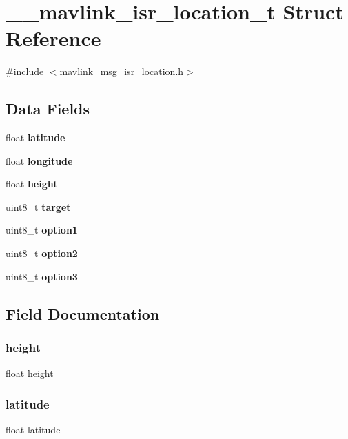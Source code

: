 \section{\+\_\+\+\_\+mavlink\+\_\+isr\+\_\+location\+\_\+t Struct Reference}
\label{struct____mavlink__isr__location__t}


{\ttfamily \#include $<$mavlink\+\_\+msg\+\_\+isr\+\_\+location.\+h$>$}

\subsection*{Data Fields}
\begin{DoxyCompactItemize}
\item 
float \textbf{ latitude}
\item 
float \textbf{ longitude}
\item 
float \textbf{ height}
\item 
uint8\+\_\+t \textbf{ target}
\item 
uint8\+\_\+t \textbf{ option1}
\item 
uint8\+\_\+t \textbf{ option2}
\item 
uint8\+\_\+t \textbf{ option3}
\end{DoxyCompactItemize}


\subsection{Field Documentation}
\mbox{\label{struct____mavlink__isr__location__t_a48083b65ac9a863566dc3e3fff09a5b4}} 
\subsubsection{height}
{\footnotesize\ttfamily float height}

\mbox{\label{struct____mavlink__isr__location__t_ad9e643bc6bd5a62b9b5011cf1c93629e}} 
\subsubsection{latitude}
{\footnotesize\ttfamily float latitude}

